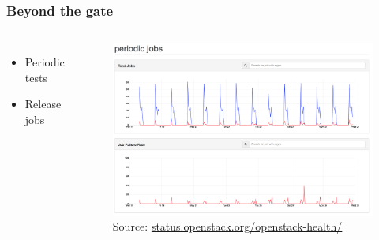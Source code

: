 \documentclass[aspectratio=169,11pt,hyperref={colorlinks=true}]{beamer}
\begin{document}

\begin{frame}
    \frametitle{Beyond the gate}
    \begin{columns}
            \begin{itemize}
                \item{Periodic tests}
                \item{Release jobs}
            \end{itemize}
            \begin{figure}
                \includegraphics[width=1\textwidth]{periodic_jobs.png}
                \caption{Source: \href{http://status.openstack.org/openstack-health/\#/g/build_queue/periodic}{status.openstack.org/openstack-health/}}
            \end{figure}
    \end{columns}
\end{frame}

\end{document}
